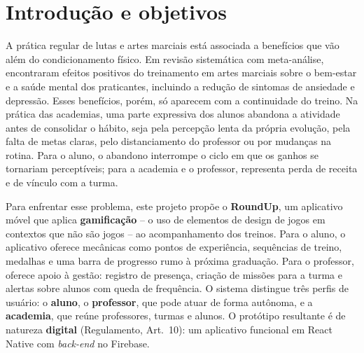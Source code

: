 %

\chapter{Introdução e objetivos}
\label{cap:introducao}

A prática regular de lutas e artes marciais está associada a benefícios
que vão além do condicionamento físico. Em revisão sistemática com
meta-análise,  encontraram efeitos positivos do
treinamento em artes marciais sobre o bem-estar e a saúde mental dos
praticantes, incluindo a redução de sintomas de ansiedade e depressão.
Esses benefícios, porém, só aparecem com a continuidade do treino. Na
prática das academias, uma parte expressiva dos alunos abandona a
atividade antes de consolidar o hábito, seja pela percepção lenta da
própria evolução, pela falta de metas claras, pelo distanciamento do
professor ou por mudanças na rotina. Para o aluno, o abandono interrompe
o ciclo em que os ganhos se tornariam perceptíveis; para a academia e o
professor, representa perda de receita e de vínculo com a turma.

Para enfrentar esse problema, este projeto propõe o \textbf{RoundUp}, um
aplicativo móvel que aplica \textbf{gamificação} -- o uso de elementos de
design de jogos em contextos que não são jogos \cite{deterding2011} -- ao
acompanhamento dos treinos. Para o aluno, o aplicativo oferece mecânicas
como pontos de experiência, sequências de treino, medalhas e uma barra de
progresso rumo à próxima graduação. Para o professor, oferece apoio à
gestão: registro de presença, criação de missões para a turma e alertas
sobre alunos com queda de frequência. O sistema distingue três perfis de
usuário: o \textbf{aluno}, o \textbf{professor}, que pode atuar de forma
autônoma, e a \textbf{academia}, que reúne professores, turmas e alunos.
O protótipo resultante é de natureza \textbf{digital} (Regulamento,
Art.~10): um aplicativo funcional em React Native com \textit{back-end}
no Firebase.

